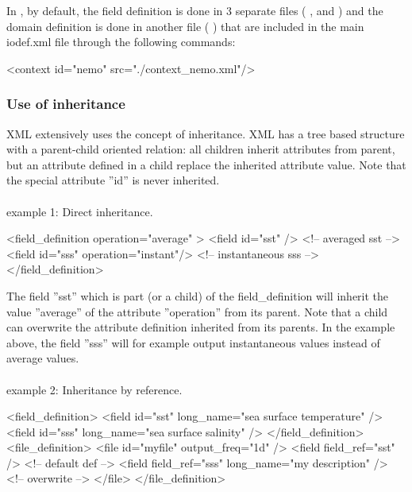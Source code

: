 \documentclass[../main/NEMO_manual]{subfiles}
\begin{document}
\noindent In \NEMO, by default, the field definition is done in 3 separate files (
,
 and
 ) and the  domain definition is done in another file (  )
that
are included in the main iodef.xml file through the following commands:
\begin{xmllines}
<context id="nemo" src="./context_nemo.xml"/>
\end{xmllines}

\subsubsection{Use of inheritance}

XML extensively uses the concept of inheritance.
XML has a tree based structure with a parent-child oriented relation: all children inherit attributes from parent,
but an attribute defined in a child replace the inherited attribute value.
Note that the special attribute ''id'' is never inherited.
\\
\\
example 1: Direct inheritance.

\begin{xmllines}
<field_definition operation="average" >
	<field id="sst"                    />   <!-- averaged      sst -->
	<field id="sss" operation="instant"/>   <!-- instantaneous sss -->
</field_definition>
\end{xmllines}

The field ''sst'' which is part (or a child) of the field\_definition will inherit the value ''average'' of
the attribute ''operation'' from its parent.
Note that a child can overwrite the attribute definition inherited from its parents.
In the example above, the field ''sss'' will for example output instantaneous values instead of average values.
\\
\\
example 2: Inheritance by reference.

\begin{xmllines}
<field_definition>
	<field id="sst" long_name="sea surface temperature" />
	<field id="sss" long_name="sea surface salinity"    />
</field_definition>
<file_definition>
	<file id="myfile" output_freq="1d" />
		<field field_ref="sst"                            />  <!-- default def -->
		<field field_ref="sss" long_name="my description" />  <!-- overwrite   -->
	</file>
</file_definition>
\end{xmllines}
\end{document}
